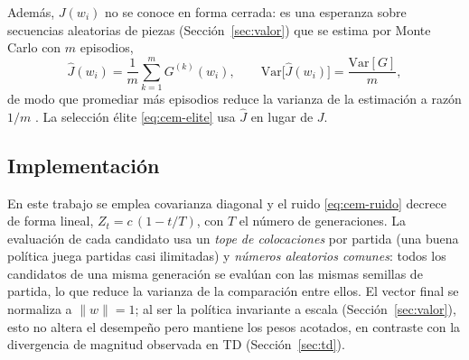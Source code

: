 Además, $J(w_{i})$ no se conoce en forma cerrada: es una esperanza sobre secuencias
aleatorias de piezas (Sección~\ref{sec:valor}) que se estima por Monte Carlo con $m$
episodios,
\begin{equation}
  \hat{J}(w_{i}) = \frac{1}{m} \sum_{k=1}^{m} G^{(k)}(w_{i}),
  \qquad
  \mathrm{Var}\big[\hat{J}(w_{i})\big] = \frac{\mathrm{Var}[G]}{m},
  \label{eq:cem-mc}
\end{equation}
de modo que promediar más episodios reduce la varianza de la estimación a razón $1/m$
\citep{rubinstein1999}. La selección élite \eqref{eq:cem-elite} usa $\hat{J}$ en lugar
de $J$.

\subsection{Implementación}
En este trabajo se emplea covarianza diagonal y el ruido \eqref{eq:cem-ruido} decrece
de forma lineal, $Z_{t} = c\,(1 - t/T)$, con $T$ el número de generaciones. La
evaluación de cada candidato usa un \emph{tope de colocaciones} por partida (una buena
política juega partidas casi ilimitadas) y \emph{números aleatorios comunes}: todos los
candidatos de una misma generación se evalúan con las mismas semillas de partida, lo
que reduce la varianza de la comparación entre ellos. El vector final se normaliza a
$\lVert w \rVert = 1$; al ser la política invariante a escala (Sección~\ref{sec:valor}),
esto no altera el desempeño pero mantiene los pesos acotados, en contraste con la
divergencia de magnitud observada en TD (Sección~\ref{sec:td}).
